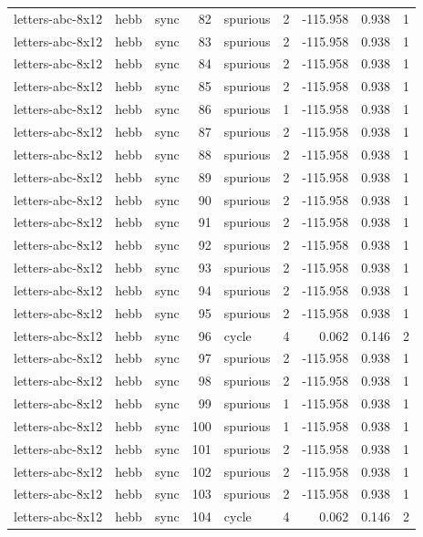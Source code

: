 \begin{tabular}{lllrlrrrr}
letters-abc-8x12 & hebb & sync & 82 & spurious & 2 & -115.958 & 0.938 & 1 \\
letters-abc-8x12 & hebb & sync & 83 & spurious & 2 & -115.958 & 0.938 & 1 \\
letters-abc-8x12 & hebb & sync & 84 & spurious & 2 & -115.958 & 0.938 & 1 \\
letters-abc-8x12 & hebb & sync & 85 & spurious & 2 & -115.958 & 0.938 & 1 \\
letters-abc-8x12 & hebb & sync & 86 & spurious & 1 & -115.958 & 0.938 & 1 \\
letters-abc-8x12 & hebb & sync & 87 & spurious & 2 & -115.958 & 0.938 & 1 \\
letters-abc-8x12 & hebb & sync & 88 & spurious & 2 & -115.958 & 0.938 & 1 \\
letters-abc-8x12 & hebb & sync & 89 & spurious & 2 & -115.958 & 0.938 & 1 \\
letters-abc-8x12 & hebb & sync & 90 & spurious & 2 & -115.958 & 0.938 & 1 \\
letters-abc-8x12 & hebb & sync & 91 & spurious & 2 & -115.958 & 0.938 & 1 \\
letters-abc-8x12 & hebb & sync & 92 & spurious & 2 & -115.958 & 0.938 & 1 \\
letters-abc-8x12 & hebb & sync & 93 & spurious & 2 & -115.958 & 0.938 & 1 \\
letters-abc-8x12 & hebb & sync & 94 & spurious & 2 & -115.958 & 0.938 & 1 \\
letters-abc-8x12 & hebb & sync & 95 & spurious & 2 & -115.958 & 0.938 & 1 \\
letters-abc-8x12 & hebb & sync & 96 & cycle & 4 & 0.062 & 0.146 & 2 \\
letters-abc-8x12 & hebb & sync & 97 & spurious & 2 & -115.958 & 0.938 & 1 \\
letters-abc-8x12 & hebb & sync & 98 & spurious & 2 & -115.958 & 0.938 & 1 \\
letters-abc-8x12 & hebb & sync & 99 & spurious & 1 & -115.958 & 0.938 & 1 \\
letters-abc-8x12 & hebb & sync & 100 & spurious & 1 & -115.958 & 0.938 & 1 \\
letters-abc-8x12 & hebb & sync & 101 & spurious & 2 & -115.958 & 0.938 & 1 \\
letters-abc-8x12 & hebb & sync & 102 & spurious & 2 & -115.958 & 0.938 & 1 \\
letters-abc-8x12 & hebb & sync & 103 & spurious & 2 & -115.958 & 0.938 & 1 \\
letters-abc-8x12 & hebb & sync & 104 & cycle & 4 & 0.062 & 0.146 & 2 \\

\end{tabular}

